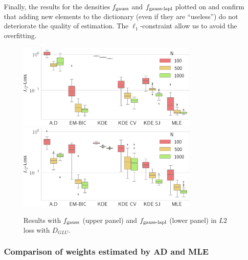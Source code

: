 Finally, the results for the densities $f_{\textnormal{gauss}}$ and $f_{\textnormal{gauss-lapl}}$
plotted on  and  confirm that
adding new elements to the dictionary (even if they are ``useless'') do not deteriorate
the quality of estimation. The $\ell_1$-constraint allow us to avoid the overfitting. 
\begin{figure}
\center
    \includegraphics[width=0.8\textwidth]{./TeX_files/res_gauss_L2_GLU.png}
    \includegraphics[width=0.8\textwidth]{./TeX_files/res_lapl_gauss_L2_GLU.png}
    \caption{Results with $f_{\textnormal{gauss}}$ (upper panel) and $f_{\textnormal{gauss-lapl}}$ 
    (lower panel) in $L2$ loss with $D_{GLU}$.}
    \label{fig:res_ext_L2_GLU}
\end{figure}

\subsubsection{Comparison of weights estimated by AD and MLE}

